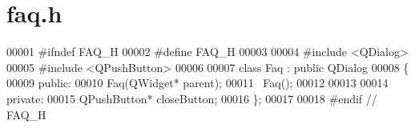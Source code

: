 \section{faq.\-h}

\begin{DoxyCode}
00001 \textcolor{preprocessor}{#ifndef FAQ\_H}
00002 \textcolor{preprocessor}{}\textcolor{preprocessor}{#define FAQ\_H}
00003 \textcolor{preprocessor}{}
00004 \textcolor{preprocessor}{#include <QDialog>}
00005 \textcolor{preprocessor}{#include <QPushButton>}
00006 
00007 \textcolor{keyword}{class }Faq : \textcolor{keyword}{public} QDialog
00008 \{
00009 \textcolor{keyword}{public}:
00010     Faq(QWidget* parent);
00011     ~Faq();
00012 
00013 
00014 \textcolor{keyword}{private}:
00015     QPushButton* closeButton;
00016 \};
00017 
00018 \textcolor{preprocessor}{#endif // FAQ\_H}
\end{DoxyCode}
